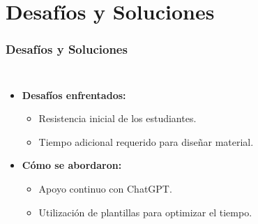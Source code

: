 \section{Desafíos y Soluciones}

\begin{frame}
    \frametitle{Desafíos y Soluciones}
    \begin{columns}
    \begin{itemize}[leftmargin=*]
        \item \textbf{Desafíos enfrentados:}
        \begin{itemize}[leftmargin=*]
            \item Resistencia inicial de los estudiantes. 
            \item Tiempo adicional requerido para diseñar material.
        \end{itemize}
        \item \textbf{Cómo se abordaron:}
        \begin{itemize}[leftmargin=*]
            \item Apoyo continuo con ChatGPT.
            \item Utilización de plantillas para optimizar el tiempo.
        \end{itemize}
    \end{itemize}
        \begin{center}
        \end{center}
    \end{columns}
\end{frame}
